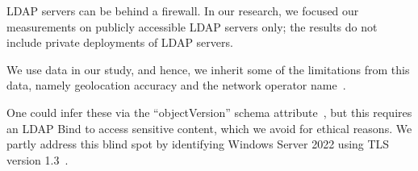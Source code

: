 




\gls{LDAP} servers can be behind a firewall. In our research, we focused our measurements on publicly accessible \gls{LDAP} servers only; the results do not include private deployments of \gls{LDAP} servers.


We use \iptwolocation data in our study, and hence, we inherit some of the limitations from this data, namely geolocation accuracy and the network operator name~\cite{_IPGeolocationCapabilities_2024}.


One could infer these via the ``objectVersion'' schema attribute~\cite{robinharwood_FindCurrentActive_2024}, but this requires an \gls{LDAP} Bind to access sensitive content, which we avoid for ethical reasons. We partly address this blind spot by identifying Windows Server 2022 using TLS version 1.3~\cite{alvinashcraft_ProtocolsTLSSSL_2024}. 




